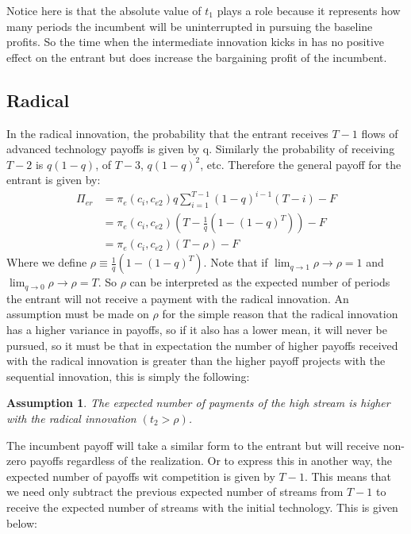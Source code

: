 \documentclass[12pt]{report}
\newtheorem{assumption}{Assumption}
\numberwithin{equation}{section}
\begin{document}
Notice here is that the absolute value of $t_1$ plays a role because it represents how many periods the incumbent will be uninterrupted in pursuing the baseline profits. So the time when the intermediate innovation kicks in has no positive effect on the entrant but does increase the bargaining profit of the incumbent. 
\subsection{Radical}
In the radical innovation, the probability that the entrant receives $T-1$ flows of advanced technology payoffs is given by q. Similarly the probability of receiving $T-2$ is $q(1-q)$, of $T-3$, $q(1-q)^2$, etc. Therefore the general payoff for the entrant is given by:
\begin{align*}
\Pi_{er} & = 
\pi_{e}(c_i,c_{e2}) q \sum_{i=1}^{T-1} (1-q)^{i-1} (T-i) -F \\
&= \pi_{e}(c_i,c_{e2}) \left( T- \frac{1}{q} \left( 1-(1-q)^{T} \right) \right) -F \\
&= \pi_{e}(c_i,c_{e2}) \left( T- \rho \right) -F 
\end{align*}
Where we define $\rho \equiv \frac{1}{q} \left( 1-(1-q)^{T} \right)$. Note that if $\lim_{q \to 1} \rho \rightarrow \rho = 1 $ and $\lim_{q \to 0} \rho \rightarrow \rho = T$. So $\rho$ can be interpreted as the expected number of periods the entrant will not receive a payment with the radical innovation. An assumption must be made on $\rho$ for the simple reason that the radical innovation has a higher variance in payoffs, so if it also has a lower mean, it will never be pursued, so it must be that in expectation the number of higher payoffs received with the radical innovation is greater than the higher payoff projects with the sequential innovation, this is simply the following: 
\newline
\begin{assumption}\label{rho}
The expected number of payments of the high stream is higher with the radical innovation $(t_2>\rho)$. 
\end{assumption}
The incumbent payoff will take a similar form to the entrant but will receive non-zero payoffs regardless of the realization. Or to express this in another way, the expected number of payoffs wit competition is given by $T-1$. This means that we need only subtract the previous expected number of streams from $T-1$ to receive the expected number of streams with the initial technology. This is given below: 
\end{document}
